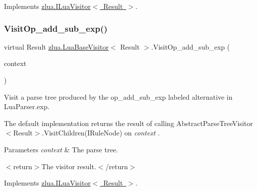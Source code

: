 Implements \mbox{\hyperlink{interfacezlua_1_1_i_lua_visitor_aef219d971f96173231ecdae24f14c988}{zlua.\+I\+Lua\+Visitor$<$ Result $>$}}.

\mbox{\label{classzlua_1_1_lua_base_visitor_aa4492d5f54ee93070caba1efbcdcf7f2}} 
\subsubsection{\texorpdfstring{Visit\+Op\+\_\+add\+\_\+sub\+\_\+exp()}{VisitOp\_add\_sub\_exp()}}
{\footnotesize\ttfamily virtual Result \mbox{\hyperlink{classzlua_1_1_lua_base_visitor}{zlua.\+Lua\+Base\+Visitor}}$<$ Result $>$.Visit\+Op\+\_\+add\+\_\+sub\+\_\+exp (\begin{DoxyParamCaption}\item[{\mbox{[}\+Not\+Null\mbox{]} \mbox{\hyperlink{classzlua_1_1_lua_parser_1_1_op__add__sub__exp_context}{Lua\+Parser.\+Op\+\_\+add\+\_\+sub\+\_\+exp\+Context}}}]{context }\end{DoxyParamCaption})\hspace{0.3cm}{\ttfamily [virtual]}}



Visit a parse tree produced by the {\ttfamily op\+\_\+add\+\_\+sub\+\_\+exp} labeled alternative in Lua\+Parser.\+exp. 

The default implementation returns the result of calling Abstract\+Parse\+Tree\+Visitor$<$\+Result$>$.\+Visit\+Children(\+I\+Rule\+Node) on {\itshape context} . 


\begin{DoxyParams}{Parameters}
{\em context} & The parse tree.\\
\hline
\end{DoxyParams}
$<$return$>$The visitor result.$<$/return$>$ 

Implements \mbox{\hyperlink{interfacezlua_1_1_i_lua_visitor_a07aadc305c06aa2b8c8c724a0262d998}{zlua.\+I\+Lua\+Visitor$<$ Result $>$}}.

\mbox{\label{classzlua_1_1_lua_base_visitor_a44cd305cf8712913e46a7ed7171206d7}} 
